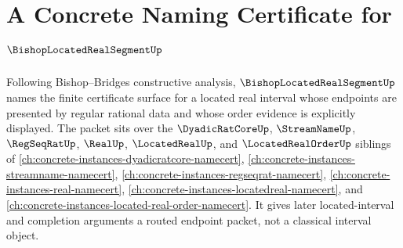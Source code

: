 \chapter{A Concrete Naming Certificate for $\BishopLocatedRealSegmentUp$}
\label{ch:concrete-instances-bishop-located-real-segment-namecert}

Following Bishop--Bridges constructive analysis, $\BishopLocatedRealSegmentUp$ names the finite certificate surface for a located real interval whose endpoints are presented by regular rational data and whose order evidence is explicitly displayed. The packet sits over the $\DyadicRatCoreUp$, $\StreamNameUp$, $\RegSeqRatUp$, $\RealUp$, $\LocatedRealUp$, and $\LocatedRealOrderUp$ siblings of \autoref{ch:concrete-instances-dyadicratcore-namecert}, \autoref{ch:concrete-instances-streamname-namecert}, \autoref{ch:concrete-instances-regseqrat-namecert}, \autoref{ch:concrete-instances-real-namecert}, \autoref{ch:concrete-instances-locatedreal-namecert}, and \autoref{ch:concrete-instances-located-real-order-namecert}. It gives later located-interval and completion arguments a routed endpoint packet, not a classical interval object.

